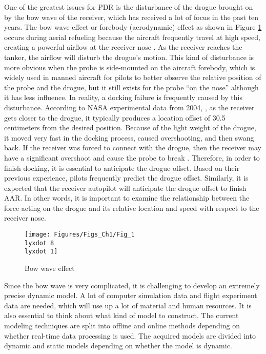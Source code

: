 One of the greatest issues for PDR is the disturbance of the drogue
brought on by the bow wave of the receiver, which has received a lot
of focus in the past ten years\cite{dai2018terminal}. The bow wave
effect or forebody (aerodynamic) effect as shown in Figure \ref{Fig_1.8-7}
occurs during aerial refueling because the aircraft frequently travel
at high speed, creating a powerful airflow at the receiver nose\textbf{
}\cite{ro2011dynamics,Dibley-2007-2}. As the receiver reaches the
tanker, the airflow will disturb the drogue's motion. This kind of
disturbance is more obvious when the probe is side-mounted on the
aircraft forebody, which is widely used in manned aircraft for pilots
to better observe the relative position of the probe and the drogue,
but it still exists for the probe \textquotedblleft on the nose\textquotedblright{}
although it has less influence. In reality, a docking failure is frequently
caused by this disturbance. According to NASA experimental data from
2004\cite{vachon2004calculated}, \cite{Hansen-2004-4}, as the receiver
gets closer to the drogue, it typically produces a location offset
of 30.5 centimeters from the desired position. Because
of the light weight of the drogue, it moved very fast in the docking
process, caused overshooting, and then swang back. If the receiver
was forced to connect with the drogue, then the receiver may have
a significant overshoot and cause the probe to break \cite{ro2011dynamics}.
Therefore, in order to finish docking, it is essential to anticipate
the drogue offset. Based on their previous experience, pilots frequently
predict the drogue offset. Similarly, it is expected that the receiver
autopilot will anticipate the drogue offset to finish AAR. In other
words, it is important to examine the relationship between the force
acting on the drogue and its relative location and speed with respect
to the receiver nose. 
\begin{figure}
\begin{centering}
\texttt{[image: Figures/Figs\_Ch1/Fig\_1\\lyxdot 8\\lyxdot 1]}
\par\end{centering}
\caption{Bow wave effect\textbf{ }\cite{bhandari2013bow}}

\centering{}\label{Fig_1.8-7}
\end{figure}

Since the bow wave is very complicated, it is challenging to develop
an extremely precise dynamic model. A lot of computer simulation data
and flight experiment data are needed, which will use up a lot of
material and human resources. It is also essential to think about
what kind of model to construct. The current modeling techniques are
split into offline and online methods depending on whether real-time
data processing is used. The acquired models are divided into dynamic
and static models depending on whether the model is dynamic. 

